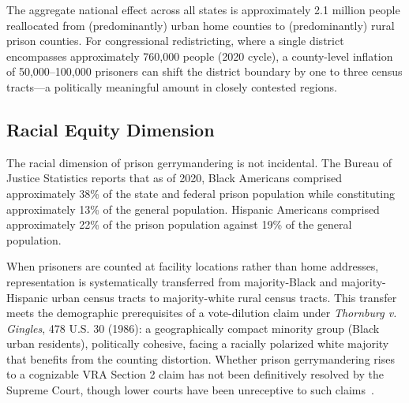 The aggregate national effect across all states is approximately 2.1 million people reallocated from (predominantly) urban home counties to (predominantly) rural prison counties. For congressional redistricting, where a single district encompasses approximately 760,000 people (2020 cycle), a county-level inflation of 50,000--100,000 prisoners can shift the district boundary by one to three census tracts---a politically meaningful amount in closely contested regions.

\subsection{Racial Equity Dimension}

The racial dimension of prison gerrymandering is not incidental. The Bureau of Justice Statistics reports that as of 2020, Black Americans comprised approximately 38\% of the state and federal prison population while constituting approximately 13\% of the general population. Hispanic Americans comprised approximately 22\% of the prison population against 19\% of the general population.

When prisoners are counted at facility locations rather than home addresses, representation is systematically transferred from majority-Black and majority-Hispanic urban census tracts to majority-white rural census tracts. This transfer meets the demographic prerequisites of a vote-dilution claim under \emph{Thornburg v. Gingles}, 478 U.S. 30 (1986): a geographically compact minority group (Black urban residents), politically cohesive, facing a racially polarized white majority that benefits from the counting distortion. Whether prison gerrymandering rises to a cognizable VRA Section 2 claim has not been definitively resolved by the Supreme Court, though lower courts have been unreceptive to such claims~\citep{larios2004}.
